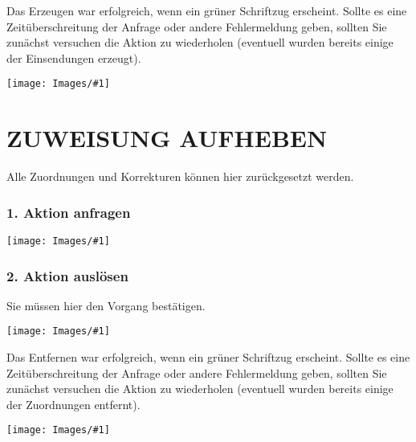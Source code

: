 \documentclass[a4paper,final]{scrartcl}
\numberwithin{equation}{section}
\newenvironment{Bilder}
  {\par\raggedbottom\null\noindent\minipage{\textwidth}\centering}
  {\endminipage\vspace{0.7cm}}
\newcommand{\tbild}[1]{%
\begin{Bilder}
 \texttt{[image: Images/\#1]}
	\end{Bilder}
}
\begin{document}
Das Erzeugen war erfolgreich, wenn ein grüner Schriftzug erscheint. Sollte es eine Zeitüberschreitung der Anfrage oder andere Fehlermeldung geben, sollten Sie zunächst versuchen die Aktion zu wiederholen (eventuell wurden bereits einige der Einsendungen erzeugt).
\tbild{makeC.png}

\newpage
\section{ZUWEISUNG AUFHEBEN}
Alle Zuordnungen und Korrekturen können hier zurückgesetzt werden.
\subsubsection*{1. Aktion anfragen}
\tbild{removeA.png}

\subsubsection*{2. Aktion auslösen}
Sie müssen hier den Vorgang bestätigen.
\tbild{removeB.png}

Das Entfernen war erfolgreich, wenn ein grüner Schriftzug erscheint. Sollte es eine Zeitüberschreitung der Anfrage oder andere Fehlermeldung geben, sollten Sie zunächst versuchen die Aktion zu wiederholen (eventuell wurden bereits einige der Zuordnungen entfernt).
\tbild{removeC.png}
\end{document}

